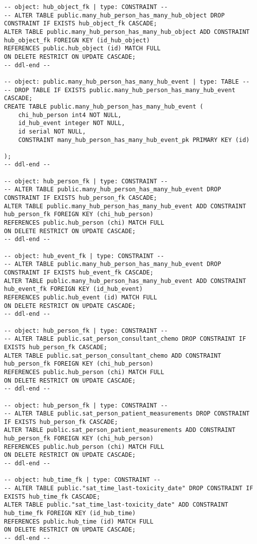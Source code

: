 \begin{lstlisting}
-- object: hub_object_fk | type: CONSTRAINT --
-- ALTER TABLE public.many_hub_person_has_many_hub_object DROP CONSTRAINT IF EXISTS hub_object_fk CASCADE;
ALTER TABLE public.many_hub_person_has_many_hub_object ADD CONSTRAINT hub_object_fk FOREIGN KEY (id_hub_object)
REFERENCES public.hub_object (id) MATCH FULL
ON DELETE RESTRICT ON UPDATE CASCADE;
-- ddl-end --

-- object: public.many_hub_person_has_many_hub_event | type: TABLE --
-- DROP TABLE IF EXISTS public.many_hub_person_has_many_hub_event CASCADE;
CREATE TABLE public.many_hub_person_has_many_hub_event (
	chi_hub_person int4 NOT NULL,
	id_hub_event integer NOT NULL,
	id serial NOT NULL,
	CONSTRAINT many_hub_person_has_many_hub_event_pk PRIMARY KEY (id)

);
-- ddl-end --

-- object: hub_person_fk | type: CONSTRAINT --
-- ALTER TABLE public.many_hub_person_has_many_hub_event DROP CONSTRAINT IF EXISTS hub_person_fk CASCADE;
ALTER TABLE public.many_hub_person_has_many_hub_event ADD CONSTRAINT hub_person_fk FOREIGN KEY (chi_hub_person)
REFERENCES public.hub_person (chi) MATCH FULL
ON DELETE RESTRICT ON UPDATE CASCADE;
-- ddl-end --

-- object: hub_event_fk | type: CONSTRAINT --
-- ALTER TABLE public.many_hub_person_has_many_hub_event DROP CONSTRAINT IF EXISTS hub_event_fk CASCADE;
ALTER TABLE public.many_hub_person_has_many_hub_event ADD CONSTRAINT hub_event_fk FOREIGN KEY (id_hub_event)
REFERENCES public.hub_event (id) MATCH FULL
ON DELETE RESTRICT ON UPDATE CASCADE;
-- ddl-end --

-- object: hub_person_fk | type: CONSTRAINT --
-- ALTER TABLE public.sat_person_consultant_chemo DROP CONSTRAINT IF EXISTS hub_person_fk CASCADE;
ALTER TABLE public.sat_person_consultant_chemo ADD CONSTRAINT hub_person_fk FOREIGN KEY (chi_hub_person)
REFERENCES public.hub_person (chi) MATCH FULL
ON DELETE RESTRICT ON UPDATE CASCADE;
-- ddl-end --

-- object: hub_person_fk | type: CONSTRAINT --
-- ALTER TABLE public.sat_person_patient_measurements DROP CONSTRAINT IF EXISTS hub_person_fk CASCADE;
ALTER TABLE public.sat_person_patient_measurements ADD CONSTRAINT hub_person_fk FOREIGN KEY (chi_hub_person)
REFERENCES public.hub_person (chi) MATCH FULL
ON DELETE RESTRICT ON UPDATE CASCADE;
-- ddl-end --

-- object: hub_time_fk | type: CONSTRAINT --
-- ALTER TABLE public."sat_time_last-toxicity_date" DROP CONSTRAINT IF EXISTS hub_time_fk CASCADE;
ALTER TABLE public."sat_time_last-toxicity_date" ADD CONSTRAINT hub_time_fk FOREIGN KEY (id_hub_time)
REFERENCES public.hub_time (id) MATCH FULL
ON DELETE RESTRICT ON UPDATE CASCADE;
-- ddl-end --


\end{lstlisting}

